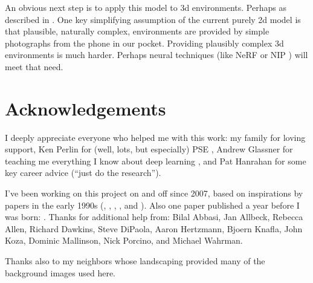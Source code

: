 \documentclass[letterpaper]{article}
\begin{document}
\par
An obvious next step is to apply this model to 3d environments. Perhaps as described in \citet{miller_color_2022}. One key simplifying assumption of the current purely 2d model is that plausible, naturally complex, environments are provided by simple photographs from the phone in our pocket. Providing plausibly complex 3d environments is much harder. Perhaps neural techniques (like NeRF \cite{gao_nerf_2022} or NIP \cite{sharp_spelunking_2022}) will meet that need.
\par



\section{Acknowledgements}
I deeply appreciate everyone who helped me with this work: my family for loving support, Ken Perlin for (well, lots, but especially) PSE \cite{perlin_image_1985}, Andrew Glassner for teaching me everything I know about deep learning \cite{glassner_deep_2021}, and Pat Hanrahan for some key career advice (“just do the research”).
\par
I've been working on this project on and off since 2007, based on inspirations by papers in the early 1990s (\citet{witkin_reaction_1991}, \citet{turk_generating_1991}, \citet{angeline_competitive_1993}, \citet{sims_artificial_1991}, and \citet{sims_evolving_1994}). Also one paper published a year before I was born: \citet{turing_chemical_1952}.
Thanks for additional help from:
Bilal Abbasi,
Jan Allbeck,
Rebecca Allen,
Richard Dawkins,
Steve DiPaola,
Aaron Hertzmann,
Bjoern Knafla,
John Koza,
Dominic Mallinson,
Nick Porcino,
and Michael Wahrman.
\par
Thanks also to my neighbors whose landscaping provided many of the background images used here.
\par

\end{document}

